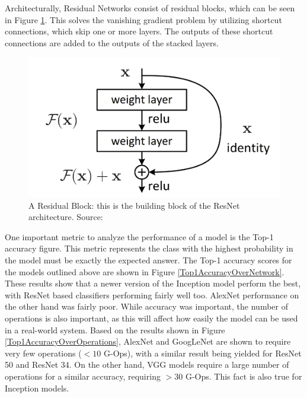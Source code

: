 \documentclass[10pt,a4paper]{article}
\begin{document}
            Architecturally, Residual Networks consist of residual blocks, which can be seen in Figure \ref{ResidualBlock}. This solves the vanishing gradient problem by utilizing shortcut
            connections, which skip one or more layers. The outputs of these shortcut connections are added to the outputs of the stacked layers.

            \begin{figure}
                \centering
                \includegraphics[width=.7\linewidth]{ResidualBlock.png}
                \caption{A Residual Block: this is the building block of the ResNet architecture. Source: \cite{DeepResidualNetworks}}
                \label{ResidualBlock}
            \end{figure}

            One important metric to analyze the performance of a model is the Top-1 accuracy figure. This metric represents the class with the highest probability in the model must be exactly the expected answer. 
            The Top-1 accuracy scores for the models outlined above are shown in Figure \ref{Top1AccuracyOverNetwork}. These results show that a newer version of the Inception model perform the best,
            with ResNet based classifiers performing fairly well too. AlexNet performance on the other hand was fairly poor. While accuracy was important, the number of operations is also important, as this will affect how easily the model can be used 
            in a real-world system. Based on the results shown in Figure \ref{Top1AccuracyOverOperations}, AlexNet and GoogLeNet are shown to require very few operations ($<10$ G-Ops),
            with a similar result being yielded for ResNet 50 and ResNet 34. On the other hand, VGG models require a large number of operations for a similar accuracy, requiring $>30$ G-Ops.
            This fact is also true for Inception models.
\end{document}
